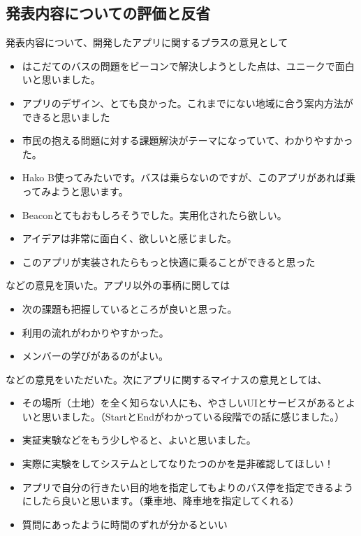 \documentclass[openany,11pt,papersize]{jsbook}
\begin{document}

\subsection{発表内容についての評価と反省}
発表内容について、開発したアプリに関するプラスの意見として
\begin{itemize}

\item はこだてのバスの問題をビーコンで解決しようとした点は、ユニークで面白いと思いました。
\item アプリのデザイン、とても良かった。これまでにない地域に合う案内方法ができると思いました
\item 市民の抱える問題に対する課題解決がテーマになっていて、わかりやすかった。
\item Hako B使ってみたいです。バスは乗らないのですが、このアプリがあれば乗ってみようと思います。
\item Beaconとてもおもしろそうでした。実用化されたら欲しい。
\item アイデアは非常に面白く、欲しいと感じました。
\item このアプリが実装されたらもっと快適に乗ることができると思った

\end{itemize}
などの意見を頂いた。アプリ以外の事柄に関しては
\begin{itemize}

\item 次の課題も把握しているところが良いと思った。
\item 利用の流れがわかりやすかった。
\item メンバーの学びがあるのがよい。

\end{itemize}
などの意見をいただいた。次にアプリに関するマイナスの意見としては、
\begin{itemize}

\item その場所（土地）を全く知らない人にも、やさしいUIとサービスがあるとよいと思いました。（StartとEndがわかっている段階での話に感じました。）
\item 実証実験などをもう少しやると、よいと思いました。
\item 実際に実験をしてシステムとしてなりたつのかを是非確認してほしい！
\item アプリで自分の行きたい目的地を指定してもよりのバス停を指定できるようにしたら良いと思います。（乗車地、降車地を指定してくれる）
\item 質問にあったように時間のずれが分かるといい

\end{itemize}
\end{document}
